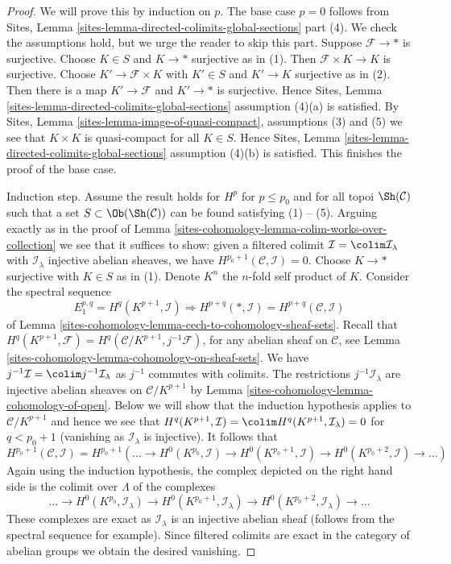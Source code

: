 \begin{proof}
We will prove this by induction on $p$. The base case $p = 0$
follows from
Sites, Lemma \ref{sites-lemma-directed-colimits-global-sections} part (4).
We check the assumptions hold, but we urge the reader to skip this part.
Suppose $\mathcal{F} \to *$ is surjective.
Choose $K \in S$ and $K \to *$ surjective as in (1). Then
$\mathcal{F} \times K \to K$ is surjective. Choose
$K' \to \mathcal{F} \times K$ with $K' \in S$ and $K' \to K$
surjective as in (2).
Then there is a map $K' \to \mathcal{F}$ and $K' \to *$ is surjective.
Hence
Sites, Lemma \ref{sites-lemma-directed-colimits-global-sections}
assumption (4)(a) is satisfied.
By Sites, Lemma \ref{sites-lemma-image-of-quasi-compact}, assumptions
(3) and (5) we see that $K \times K$ is quasi-compact
for all $K \in S$.
Hence
Sites, Lemma \ref{sites-lemma-directed-colimits-global-sections}
assumption (4)(b) is satisfied.
This finishes the proof of the base case.

\medskip\noindent
Induction step. Assume the result holds for
$H^p$ for $p \leq p_0$ and for all topoi $\Sh(\mathcal{C})$
such that a set $S \subset \Ob(\Sh(\mathcal{C}))$ can be found
satisfying (1) -- (5). Arguing exactly as in the proof of
Lemma \ref{sites-cohomology-lemma-colim-works-over-collection}
we see that it suffices to show: given a filtered colimit
$\mathcal{I} = \colim \mathcal{I}_\lambda$ with
$\mathcal{I}_\lambda$ injective abelian sheaves, we have
$H^{p_0 + 1}(\mathcal{C}, \mathcal{I}) = 0$.
Choose $K \to *$ surjective with $K \in S$ as in (1).
Denote $K^n$ the $n$-fold self product of $K$.
Consider the spectral sequence
$$
E_1^{p, q} = H^q(K^{p + 1}, \mathcal{I}) \Rightarrow
H^{p + q}(*, \mathcal{I}) = H^{p + q}(\mathcal{C}, \mathcal{I})
$$
of Lemma \ref{sites-cohomology-lemma-cech-to-cohomology-sheaf-sets}. Recall that
$H^q(K^{p + 1}, \mathcal{F}) = H^q(\mathcal{C}/K^{p + 1}, j^{-1}\mathcal{F})$,
for any abelian sheaf on $\mathcal{C}$, see
Lemma \ref{sites-cohomology-lemma-cohomology-on-sheaf-sets}. We have
$j^{-1}\mathcal{I} = \colim j^{-1}\mathcal{I}_\lambda$
as $j^{-1}$ commutes with colimits. The restrictions
$j^{-1}\mathcal{I}_\lambda$ are injective abelian sheaves
on $\mathcal{C}/K^{p + 1}$ by Lemma \ref{sites-cohomology-lemma-cohomology-of-open}.
Below we will show that the induction hypothesis applies
to $\mathcal{C}/K^{p + 1}$ and hence we see that
$H^q(K^{p + 1}, \mathcal{I}) = \colim H^q(K^{p + 1}, \mathcal{I}_\lambda) = 0$
for $q < p_0 + 1$ (vanishing as $\mathcal{I}_\lambda$ is injective).
It follows that
$$
H^{p_0 + 1}(\mathcal{C}, \mathcal{I}) =
H^{p_0 + 1}\left(\ldots \to
H^0(K^{p_0}, \mathcal{I}) \to
H^0(K^{p_0 + 1}, \mathcal{I}) \to
H^0(K^{p_0 + 2}, \mathcal{I}) \to \ldots\right)
$$
Again using the induction hypothesis, the complex depicted on the right
hand side is the colimit over $\Lambda$ of the complexes
$$
\ldots \to
H^0(K^{p_0}, \mathcal{I}_\lambda) \to
H^0(K^{p_0 + 1}, \mathcal{I}_\lambda) \to
H^0(K^{p_0 + 2}, \mathcal{I}_\lambda) \to \ldots
$$
These complexes are exact as $\mathcal{I}_\lambda$ is an
injective abelian sheaf (follows from the spectral sequence
for example). Since filtered colimits are exact in the category
of abelian groups we obtain the desired vanishing.


\end{proof}
